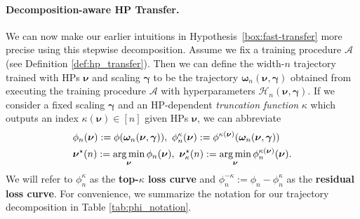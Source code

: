 \documentclass{article} %
\newcommand{\bhp}{\bm{\nu}}                       %
\newcommand{\bhpexp}{\bm{\gamma}}                 %
\newcommand{\scaledhps}{\mathcal{H}}
\newcommand{\hptrunc}{\kappa}
\newcommand{\algo}{\mathcal{A}}
\newcommand{\traj}{\bm{\omega}}
\begin{document}
\paragraph{Decomposition-aware HP Transfer.}
We can now make our earlier intuitions in Hypothesis~\ref{box:fast-transfer} more precise using this stepwise decomposition. Assume we fix a training procedure $\algo$ (see Definition \ref{def:hp_transfer}).
Then we can define the width-$n$ trajectory trained with HPs $\bhp$ and scaling $\bhpexp$ to be the trajectory $\traj_n(\bhp, \bhpexp)$ obtained from executing the training procedure $\algo$ with hyperparameters $\scaledhps_n(\bhp, \bhpexp)$. If we consider a fixed scaling $\bhpexp$ and an HP-dependent \emph{truncation function} $\hptrunc$ which outputs an index $\hptrunc(\bhp) \in [n]$ given HPs $\bhp$, we can abbreviate 
\begin{align}\label{eq:decomposition_quantities}
    &\phi_n(\bhp) := \phi(\traj_n(\bhp, \bhpexp)),~  \phi_n^\hptrunc(\bhp) := \phi^{\hptrunc(\bhp)}(\traj_n(\bhp, \bhpexp)) \notag \\
    &\bhp^\star(n) := \argmin_{\bhp} \phi_n(\bhp),~  \bhp_\hptrunc^\star(n) := \argmin_{\bhp} \phi^{\hptrunc(\bhp)}_n(\bhp).
\end{align}
We will refer to $\phi_n^\hptrunc$ as the \textbf{top-$\hptrunc$ loss curve} and $\phi_n^{-\hptrunc} := \phi_n - \phi_n^\hptrunc$ as the \textbf{residual loss curve}. For
convenience, we summarize the notation for our trajectory decomposition in Table \ref{tab:phi_notation}.
\end{document}
